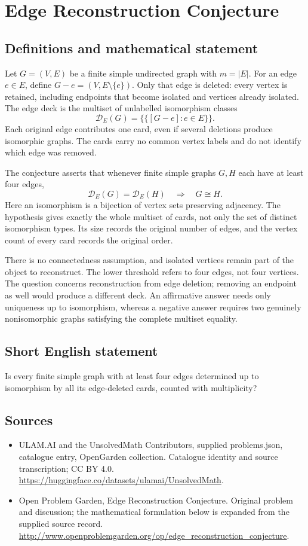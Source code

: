 \documentclass[11pt,a4paper]{article}
\begin{document}
\section*{Edge Reconstruction Conjecture}\label{statement}

\subsection{Definitions and mathematical statement}
Let $G=(V,E)$ be a finite simple undirected graph with $m=|E|$.
For an edge $e\in E$, define $G-e=(V,E\setminus\{e\})$.
Only that edge is deleted: every vertex is retained, including endpoints
that become isolated and vertices already isolated. The edge deck is the
multiset of unlabelled isomorphism classes
\[
 \mathcal D_E(G)=\{\!\{[G-e]:e\in E\}\!\}.
\]
Each original edge contributes one card, even if several deletions produce
isomorphic graphs. The cards carry no common vertex labels and do not
identify which edge was removed.

The conjecture asserts that whenever finite simple graphs $G,H$ each
have at least four edges,
\[
 \mathcal D_E(G)=\mathcal D_E(H)\quad\Longrightarrow\quad G\cong H.
\]
Here an isomorphism is a bijection of vertex sets preserving adjacency.
The hypothesis gives exactly the whole multiset of cards, not only the
set of distinct isomorphism types. Its size records the original number
of edges, and the vertex count of every card records the original order.

There is no connectedness assumption, and isolated vertices remain part
of the object to reconstruct. The lower threshold refers to four edges,
not four vertices. The question concerns reconstruction from edge deletion;
removing an endpoint as well would produce a different deck.
An affirmative answer needs only uniqueness up to isomorphism, whereas
a negative answer requires two genuinely nonisomorphic graphs satisfying
the complete multiset equality.
\subsection{Short English statement}
Is every finite simple graph with at least four edges determined up to isomorphism by all its edge-deleted cards, counted with multiplicity?
\subsection{Sources}
\begin{itemize}
\item[S1] ULAM.AI and the UnsolvedMath Contributors, supplied problems.json, catalogue entry, OpenGarden collection. Catalogue identity and source transcription; CC BY 4.0.
\url{https://huggingface.co/datasets/ulamai/UnsolvedMath}.
\item[S2] Open Problem Garden, Edge Reconstruction Conjecture. Original problem and discussion; the mathematical formulation below is expanded from the supplied source record.
\url{http://www.openproblemgarden.org/op/edge_reconstruction_conjecture}.
\end{itemize}
\end{document}
